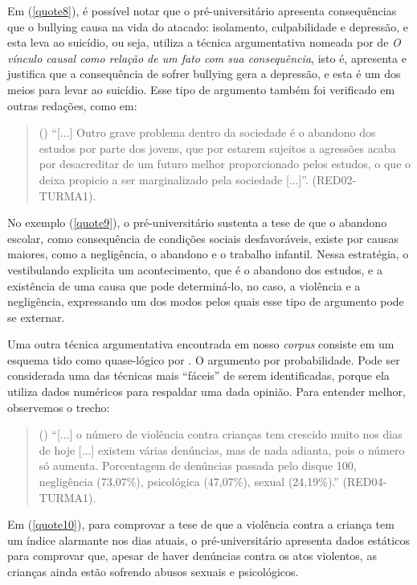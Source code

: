 \documentclass{textolivre}
\newcounter{quote}
\newenvironment{myquote}%
{%
\refstepcounter{quote}%
\begin{quote}(\thequote)%
}%
{\end{quote}}%
\begin{document}
Em (\ref{quote8}), é possível notar que o pré-universitário apresenta consequências que o bullying causa na vida do atacado: isolamento, culpabilidade e depressão, e esta leva ao suicídio, ou seja, utiliza a técnica argumentativa nomeada por \textcite{perelman1996} de \emph{O vínculo causal como relação de um fato com sua consequência}, isto é, apresenta e justifica que a consequência de sofrer bullying gera a depressão, e esta é um dos meios para levar ao suicídio. Esse tipo de argumento também foi verificado em outras redações, como em:

\begin{myquote}\label{quote9}
“[...] Outro grave problema dentro da sociedade é o abandono dos estudos por parte dos jovens, que por estarem sujeitos a agressões acaba por desacreditar de um futuro melhor proporcionado pelos estudos, o que o deixa propicio a ser marginalizado pela sociedade [...]”. (RED02-TURMA1).
\end{myquote}

No exemplo (\ref{quote9}), o pré-universitário sustenta a tese de que o abandono escolar, como consequência de condições sociais desfavoráveis, existe por causas maiores, como a negligência, o abandono e o trabalho infantil. Nessa estratégia, o vestibulando explicita um acontecimento, que é o abandono dos estudos, e a existência de uma causa que pode determiná-lo, no caso, a violência e a negligência, expressando um dos modos pelos quais esse tipo de argumento pode se externar.

Uma outra técnica argumentativa encontrada em nosso \emph{corpus} consiste em um esquema tido como quase-lógico por \textcite{perelman1996}. O argumento por probabilidade. Pode ser considerada uma das técnicas mais “fáceis” de serem identificadas, porque ela utiliza dados numéricos para respaldar uma dada opinião. Para entender melhor, observemos o trecho:

\begin{myquote}\label{quote10}
“[...] o número de violência contra crianças tem crescido muito nos dias de hoje [...] existem várias denúncias, mas de nada adianta, pois o número só aumenta. Porcentagem de denúncias passada pelo disque 100, negligência (73,07\%), psicológica (47,07\%), sexual (24,19\%).” (RED04-TURMA1).
\end{myquote}

Em (\ref{quote10}), para comprovar a tese de que a violência contra a criança tem um índice alarmante nos dias atuais, o pré-universitário apresenta dados estáticos para comprovar que, apesar de haver denúncias contra os atos violentos, as crianças ainda estão sofrendo abusos sexuais e psicológicos.
\end{document}
